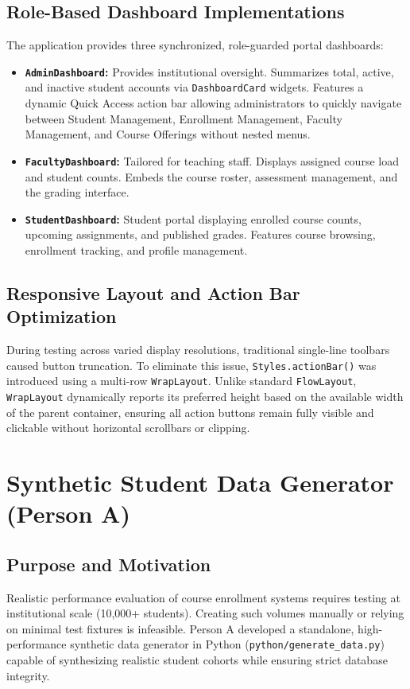\subsection{Role-Based Dashboard Implementations}
The application provides three synchronized, role-guarded portal dashboards:
\begin{itemize}
    \item \textbf{\texttt{AdminDashboard}:} Provides institutional oversight. Summarizes total, active, and inactive student accounts via \texttt{DashboardCard} widgets. Features a dynamic Quick Access action bar allowing administrators to quickly navigate between Student Management, Enrollment Management, Faculty Management, and Course Offerings without nested menus.
    \item \textbf{\texttt{FacultyDashboard}:} Tailored for teaching staff. Displays assigned course load and student counts. Embeds the course roster, assessment management, and the grading interface.
    \item \textbf{\texttt{StudentDashboard}:} Student portal displaying enrolled course counts, upcoming assignments, and published grades. Features course browsing, enrollment tracking, and profile management.
\end{itemize}

\subsection{Responsive Layout and Action Bar Optimization}
During testing across varied display resolutions, traditional single-line toolbars caused button truncation. To eliminate this issue, \texttt{Styles.actionBar()} was introduced using a multi-row \texttt{WrapLayout}. Unlike standard \texttt{FlowLayout}, \texttt{WrapLayout} dynamically reports its preferred height based on the available width of the parent container, ensuring all action buttons remain fully visible and clickable without horizontal scrollbars or clipping.

\section{Synthetic Student Data Generator (Person A)}
\label{sec:synthetic-data}

\subsection{Purpose and Motivation}
Realistic performance evaluation of course enrollment systems requires testing at institutional scale (10{,}000+ students). Creating such volumes manually or relying on minimal test fixtures is infeasible. Person A developed a standalone, high-performance synthetic data generator in Python (\texttt{python/generate_data.py}) capable of synthesizing realistic student cohorts while ensuring strict database integrity.

